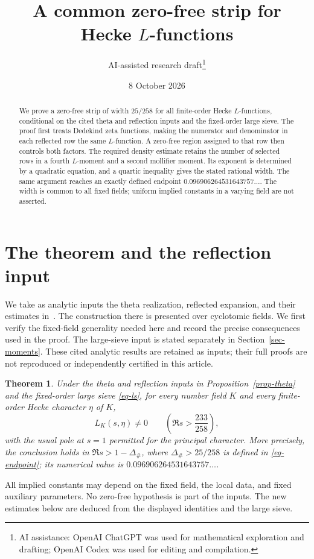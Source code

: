 \documentclass[11pt,a4paper]{article}
\title{A common zero-free strip for Hecke $L$-functions}
\author{AI-assisted research draft\thanks{AI assistance: OpenAI ChatGPT was used for mathematical exploration and drafting; OpenAI Codex was used for editing and compilation.}}
\date{8 October 2026}
\numberwithin{equation}{section}
\newtheorem{theorem}{Theorem}[section]
\theoremstyle{remark}
\begin{document}
\maketitle
\begin{abstract}
We prove a zero-free strip of width $25/258$ for all finite-order
Hecke $L$-functions, conditional on the cited theta and reflection
inputs and the fixed-order large sieve.  The proof first treats Dedekind zeta
functions, making the numerator and denominator in each reflected
row the same $L$-function.  A zero-free region assigned to that row
then controls both factors.  The required density estimate retains
the number of selected rows in a fourth $L$-moment and a second
mollifier moment.  Its exponent is determined by a quadratic
equation, and a quartic inequality gives the stated rational width.
The same argument reaches an exactly defined endpoint
$0.096906264531643757\ldots$.  The width is common to all fixed
fields; uniform implied constants in a varying field are not asserted.
\end{abstract}

\section{The theorem and the reflection input}

We take as analytic inputs the theta realization, reflected
expansion, and their estimates in~\cite[Sections~3--8 and
Appendix~A]{OAI}.  The construction there is presented over
cyclotomic fields.  We first verify the fixed-field generality
needed here and record the precise consequences used in the proof.
The large-sieve input is stated separately in Section~\ref{sec-moments}.
These cited analytic results are retained as inputs; their full
proofs are not reproduced or independently certified in this article.

\begin{theorem}\label{thm-main}
Under the theta and reflection inputs in Proposition~\ref{prop-theta}
and the fixed-order large sieve \eqref{eq-ls}, for every number
field $K$ and every finite-order Hecke character $\eta$ of $K$,
\[
 L_K(s,\eta)\ne0\qquad\left(\Re s>\frac{233}{258}\right),
\]
with the usual pole at $s=1$ permitted for the principal character.
More precisely, the conclusion holds in $\Re s>1-\Delta_\#$,
where $\Delta_\#>25/258$ is defined in
\eqref{eq-endpoint}; its numerical value is
$0.096906264531643757\ldots$.
\end{theorem}

All implied constants may depend on the fixed field, the local
data, and fixed auxiliary parameters.  No zero-free hypothesis is
part of the inputs.  The new estimates below are deduced from
the displayed identities and the large sieve.
\end{document}
